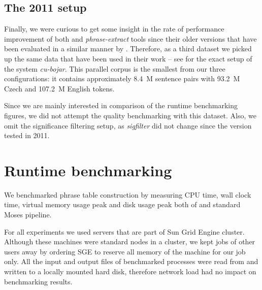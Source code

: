 \subsection{The 2011 setup}
Finally, we were curious to get some insight in the rate of performance improvement
of both \eppex{} and \emph{phrase-extract} tools since their older versions that have
been evaluated in a similar manner by \citet{przywara:eppex}.
Therefore, as a third dataset we picked up the same data that have been used in their
work -- see \citet{marecek:twostep} for the exact setup of the system \emph{cu-bojar}.
This parallel corpus is the smallest from our three configurations: it contains
approximately 8.4~M sentence pairs with 93.2~M Czech and 107.2~M English tokens.

Since we are mainly interested in comparison of the runtime benchmarking figures,
we did not attempt the quality benchmarking with this dataset.
Also, we omit the significance filtering setup, as \emph{sigfilter} did not change
since the version tested in 2011.

\section{Runtime benchmarking}

We benchmarked phrase table construction by measuring CPU time, wall clock time,
virtual memory usage peak and disk usage peak both of \eppex{} and standard Moses
pipeline.

For all experiments we used servers that are part of Sun Grid Engine cluster.
Although these machines were standard nodes in a cluster, we kept jobs of other
users away by ordering SGE to reserve all memory of the machine for our job only.
All the input and output files of benchmarked processes were read from and written
to a locally mounted hard disk, therefore network load had no impact on
benchmarking results.

